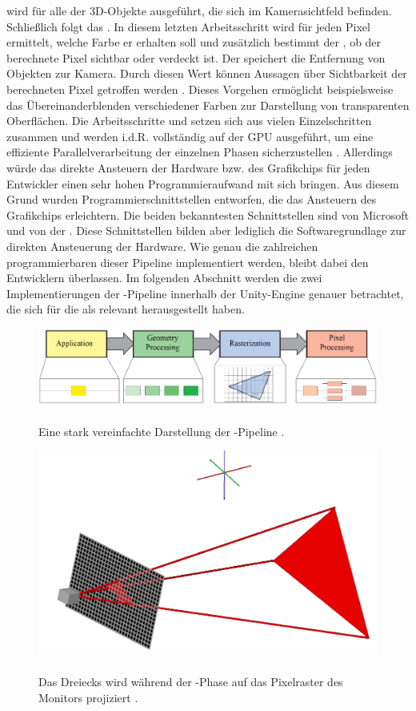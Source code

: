 wird für alle  der 3D-Objekte ausgeführt, die sich im Kamerasichtfeld befinden. Schließlich folgt das . In diesem letzten Arbeitsschritt wird für jeden Pixel ermittelt, welche Farbe er erhalten soll und zusätzlich bestimmt der , ob der berechnete Pixel sichtbar oder verdeckt ist. Der  speichert die Entfernung von Objekten zur Kamera. Durch diesen Wert können Aussagen über Sichtbarkeit der berechneten Pixel getroffen werden \cite{Catmull.1998}. Dieses Vorgehen ermöglicht beispielsweise das Übereinanderblenden verschiedener Farben zur Darstellung von transparenten Oberflächen. Die Arbeitsschritte  und  setzen sich aus vielen Einzelschritten zusammen und werden i.d.R. vollständig auf der \acs{GPU} ausgeführt, um eine effiziente Parallelverarbeitung der einzelnen Phasen sicherzustellen \cite[S.13]{AkenineMoller.2018}. Allerdings würde das direkte Ansteuern der Hardware bzw. des Grafikchips für jeden Entwickler einen sehr hohen Programmieraufwand mit sich bringen. Aus diesem Grund wurden Programmierschnittstellen entworfen, die das Ansteuern des Grafikchips erleichtern. Die beiden bekanntesten Schnittstellen sind  von Microsoft und  von der . Diese Schnittstellen bilden aber lediglich die Softwaregrundlage zur direkten Ansteuerung der Hardware. Wie genau die zahlreichen programmierbaren  dieser Pipeline implementiert werden, bleibt dabei den Entwicklern überlassen. Im folgenden Abschnitt werden die zwei Implementierungen der -Pipeline innerhalb der Unity-Engine genauer betrachtet, die sich für die \mapp als relevant herausgestellt haben.
	\begin{figure}
		\centering
		\includegraphics[width=0.8\linewidth]{images/rasterization_pipeline}
		\caption[ras_pipe]{\\Eine stark vereinfachte Darstellung der -Pipeline \cite[S.12]{AkenineMoller.2018}.}
		\label{fig:rasterizationpipeline}
	\end{figure}    
	\begin{figure}
		\centering
		\includegraphics[width=0.6\linewidth]{images/rasterization}
		\caption[rasterization]{\\Das Dreiecks wird während der -Phase auf das Pixelraster des Monitors projiziert \cite{fm.15.01.2021}.}
		\label{fig:rasterization}
	\end{figure}
%